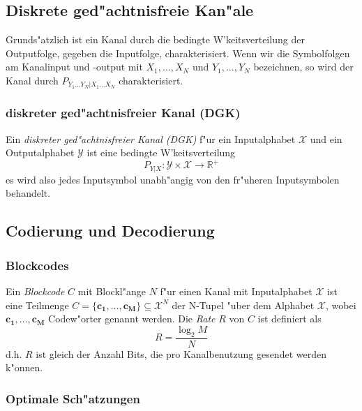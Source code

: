\documentclass[german, 10pt, a4paper, twocolumn]{scrartcl}
\begin{document}
\subsection{Diskrete ged"achtnisfreie Kan"ale}

Grunds"atzlich ist ein Kanal durch die bedingte W'keitsverteilung der Outputfolge, gegeben die Inputfolge, charakterisiert. Wenn wir die Symbolfolgen am Kanalinput und -output mit $X_1,\ldots,X_N$ und $Y_1,\ldots,Y_N$ bezeichnen, so wird der Kanal durch $P_{Y_1\ldots Y_N|X_1 \ldots X_N}$ charakterisiert.

\subsubsection{diskreter ged"achtnisfreier Kanal (DGK)}

Ein \textit{diskreter ged"achtnisfreier Kanal (DGK)} f"ur ein Inputalphabet $\mathcal{X}$ und ein Outputalphabet $\mathcal{Y}$ ist eine bedingte W'keitsverteilung
\begin{displaymath}
	P_{Y|X}: \mathcal{Y}\times \mathcal{X} \to \mathbb{R}^+
\end{displaymath}
es wird also jedes Inputsymbol unabh"angig von den fr"uheren Inputsymbolen behandelt.

\subsection{Codierung und Decodierung}

\subsubsection{Blockcodes}

Ein \textit{Blockcode} $C$ mit Blockl"ange $N$ f"ur einen Kanal mit Inputalphabet $\mathcal{X}$ ist eine Teilmenge $C=\{\mathbf{c_1},\ldots,\mathbf{c_M}\} \subseteq \mathcal{X}^N$ der N-Tupel "uber dem Alphabet $\mathcal{X}$, wobei $\mathbf{c_1},\ldots,\mathbf{c_M}$ Codew"orter genannt werden. Die \textit{Rate} $R$ von $C$ ist definiert als
\begin{displaymath}
	R = \frac{\log_2 M}{N}
\end{displaymath}
d.h. $R$ ist gleich der Anzahl Bits, die pro Kanalbenutzung gesendet werden k"onnen.

\subsubsection{Optimale Sch"atzungen}
\end{document}
